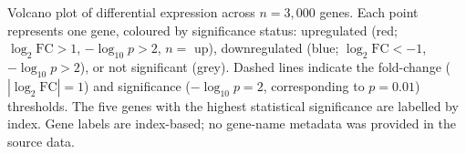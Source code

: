 \caption{Volcano plot of differential expression across $n=3{,}000$ genes. Each point represents one gene, coloured by significance status: upregulated (red; $\log_2\text{FC} > 1$, $-\log_{10}p > 2$, $n=$ up), downregulated (blue; $\log_2\text{FC} < -1$, $-\log_{10}p > 2$), or not significant (grey). Dashed lines indicate the fold-change ($|\log_2\text{FC}|=1$) and significance ($-\log_{10}p=2$, corresponding to $p=0.01$) thresholds. The five genes with the highest statistical significance are labelled by index. Gene labels are index-based; no gene-name metadata was provided in the source data.}
